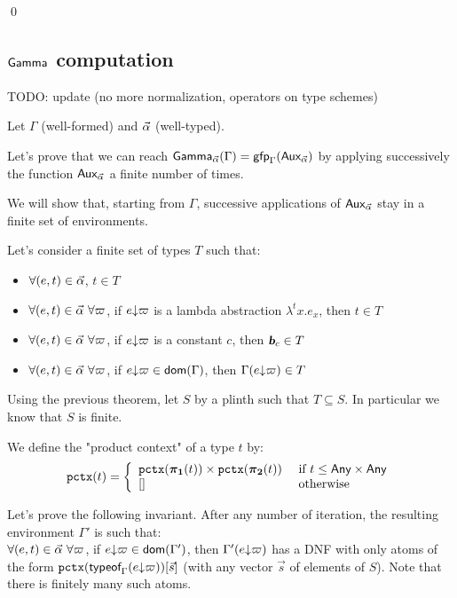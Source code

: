 \documentclass[a4paper]{article}
\theoremstyle{definition}
\begin{document}
      \qed

    \subsection{$\textsf{Gamma}_{}$ computation}

    TODO: update (no more normalization, operators on type schemes)

    Let $\Gamma$ (well-formed) and $\vec \alpha$ (well-typed).

    Let's prove that we can reach $\textsf{Gamma}_{\vec \alpha}(\Gamma)=\textsf{gfp}_\Gamma (\textsf{Aux}_{\vec \alpha})$ by applying successively the function $\textsf{Aux}_{\vec \alpha}$ a finite number of times.

    We will show that, starting from $\Gamma$, successive applications of $\textsf{Aux}_{\vec \alpha}$ stay in a finite set of environments.

    Let's consider a finite set of types $T$ such that:
    \begin{itemize}
      \item $\forall (e,t) \in \vec \alpha$, $t \in T$
      \item $\forall (e,t) \in \vec \alpha\ \forall \varpi$, if $e{\downarrow}\varpi$ is a lambda abstraction $\lambda^tx.e_x$, then $t \in T$
      \item $\forall (e,t) \in \vec \alpha\ \forall \varpi$, if $e{\downarrow}\varpi$ is a constant $c$, then $\basic{c} \in T$
      \item $\forall (e,t) \in \vec \alpha\ \forall \varpi$, if $e{\downarrow}\varpi \in \textsf{dom}(\Gamma)$, then $\Gamma(e{\downarrow}\varpi) \in T$
    \end{itemize}

    Using the previous theorem, let $S$ by a plinth such that $T \subseteq S$. In particular we know that $S$ is finite.

    We define the "product context" of a type $t$ by:
    \[
      \texttt{pctx}(t)=\left\{
        \begin{array}{ll}
          \texttt{pctx}(\boldsymbol{\pi}_{\boldsymbol 1}(t))\times \texttt{pctx}(\boldsymbol{\pi}_{\boldsymbol 2}(t)) & \text{ if } t \leq \textsf{Any}\times \textsf{Any}\\
          {[}] & \text{ otherwise}
        \end{array}  
      \right.
    \]

    Let's prove the following invariant. After any number of iteration, the resulting environment $\Gamma'$ is such that:\\
    $\forall (e,t) \in \vec \alpha\ \forall \varpi$, if $e{\downarrow}\varpi \in \textsf{dom}(\Gamma')$, then $\Gamma'(e{\downarrow}\varpi)$ has a DNF with only atoms of the form
    $\texttt{pctx}(\textsf{typeof}_{\Gamma}(e{\downarrow}\varpi))[\vec s]$ (with any vector $\vec s$ of elements of $S$).
    Note that there is finitely many such atoms.
    
\end{document}
